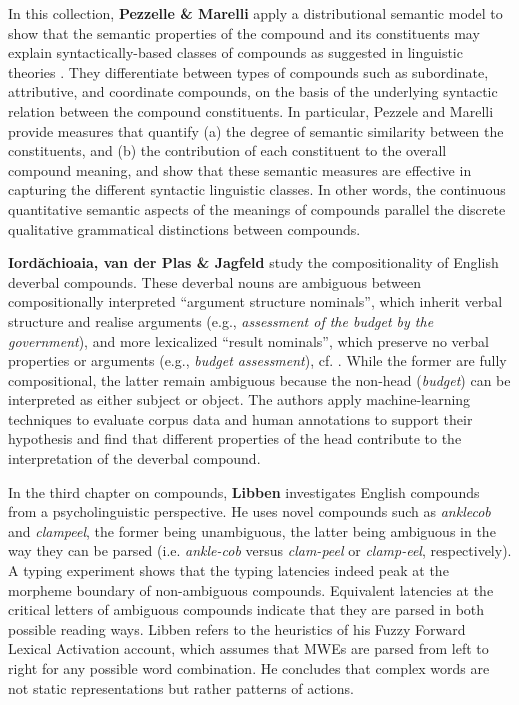\documentclass[output=paper]{langsci/langscibook}
\begin{document}
In this collection, \textbf{Pezzelle \& Marelli} apply a
distributional semantic model to show that the semantic properties of
the compound and its constituents may explain syntactically-based
classes of compounds as suggested in linguistic theories
\citep{Bisetto/Scalise:05}. They differentiate between types of
compounds such as subordinate, attributive, and coordinate compounds,
on the basis of the underlying syntactic relation between the compound
constituents. In particular, Pezzele and Marelli provide measures that
quantify (a) the degree of semantic similarity between the
constituents, and (b) the contribution of each constituent to the
overall compound meaning, and show that these semantic measures are
effective in capturing the different syntactic linguistic classes. In
other words, the continuous quantitative semantic aspects of the
meanings of compounds parallel the discrete qualitative grammatical
distinctions between compounds.

\textbf{Iord\u{a}chioaia, van der Plas \& Jagfeld} study the
compositionality of English deverbal compounds. These deverbal nouns
are ambiguous between compositionally interpreted ``argument structure
nominals'', which inherit verbal structure and realise arguments
(e.g., \textit{assessment of the budget by the government}), and more
lexicalized ``result nominals'', which preserve no verbal properties
or arguments (e.g., \textit{budget assessment}),
cf. \cite{grimshaw:90}. While the former are fully compositional, the
latter remain ambiguous because the non-head (\textit{budget}) can be
interpreted as either subject or object. The authors apply
machine-learning techniques to evaluate corpus data and human
annotations to support their hypothesis and find that different
properties of the head contribute to the interpretation of the
deverbal compound.

In the third chapter on compounds, \textbf{Libben} investigates English compounds from a psycholinguistic perspective. He uses novel compounds such as \textit{anklecob} and \textit{clampeel}, the former being unambiguous, the latter being ambiguous in the way they can be parsed (i.e. \textit{ankle-cob} versus \textit{clam-peel} or \textit{clamp-eel}, respectively). A typing experiment shows that the typing latencies indeed peak at the morpheme boundary of non-ambiguous compounds. Equivalent latencies at the critical letters of ambiguous compounds indicate that they are parsed in both possible reading ways. Libben refers to the heuristics of his Fuzzy Forward Lexical Activation account, which assumes that MWEs are parsed from left to right for any possible word combination. He concludes that complex words are not static representations but rather patterns of actions.
\end{document}
